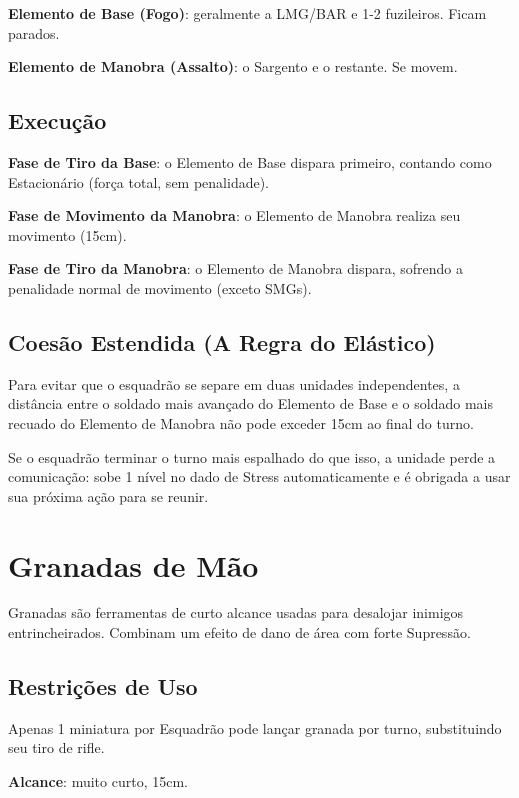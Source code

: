 \textbf{Elemento de Base (Fogo)}: geralmente a LMG/BAR e 1-2 fuzileiros. Ficam parados.

\textbf{Elemento de Manobra (Assalto)}: o Sargento e o restante. Se movem.

\subsection{Execução}

\textbf{Fase de Tiro da Base}: o Elemento de Base dispara primeiro, contando como Estacionário (força total, sem penalidade).

\textbf{Fase de Movimento da Manobra}: o Elemento de Manobra realiza seu movimento (15cm).

\textbf{Fase de Tiro da Manobra}: o Elemento de Manobra dispara, sofrendo a penalidade normal de movimento (exceto SMGs).

\subsection{Coesão Estendida (A Regra do Elástico)}

Para evitar que o esquadrão se separe em duas unidades independentes, a distância entre o soldado mais avançado do Elemento de Base e o soldado mais recuado do Elemento de Manobra não pode exceder 15cm ao final do turno.

\begin{nota}
Se o esquadrão terminar o turno mais espalhado do que isso, a unidade perde a comunicação: sobe 1 nível no dado de Stress automaticamente e é obrigada a usar sua próxima ação para se reunir.
\end{nota}

\section{Granadas de Mão}

Granadas são ferramentas de curto alcance usadas para desalojar inimigos entrincheirados. Combinam um efeito de dano de área com forte Supressão.

\subsection{Restrições de Uso}

Apenas 1 miniatura por Esquadrão pode lançar granada por turno, substituindo seu tiro de rifle.

\textbf{Alcance}: muito curto, 15cm.

